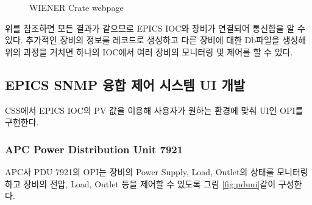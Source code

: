 \documentclass[11pt
  , a4paper
  , article
  , oneside
]{memoir}
\begin{document}
\begin{figure}[!h]
  \centering
              \hfill
              \hfill
  \caption
      {
WIENER Crate webpage
      }
 \label{fig:wienerweb}
\end{figure}


위를 참조하면 모든 결과가 같으므로 EPICS IOC와 장비가 연결되어 통신함을 알 수 있다. 추가적인 장비의 정보를 레코드로 생성하고 다른 장비에 대한 Db파일을 생성해 위의 과정을 거치면 하나의 IOC에서 여러 장비의 모니터링 및 제어를 할 수 있다.


\subsection{EPICS SNMP 융합 제어 시스템 UI 개발}

CSS에서 EPICS IOC의 PV 값을 이용해 사용자가 원하는 환경에 맞춰 UI인 OPI를 구현한다.  


\subsubsection{APC Power Distribution Unit 7921}

APC사 PDU 7921의 OPI는 장비의 Power Supply, Load, Outlet의 상태를 모니터링하고 장비의 전압, Load, Outlet 등을 제어할 수 있도록 그림 \ref{fig:pduui}같이 구성한다.
\end{document}
